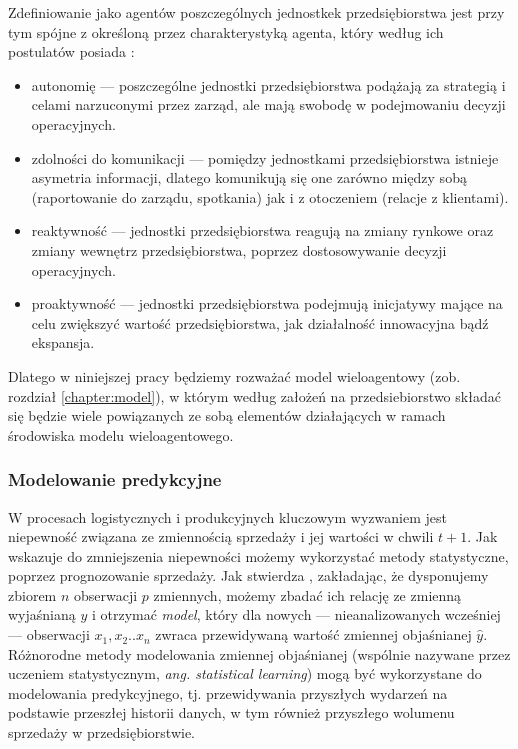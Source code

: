 \documentclass[polish, twoside, 12pt, a4paper]{article}
\theoremstyle{definition}
\theoremstyle{plain}
\theoremstyle{remark}
\begin{document}
Zdefiniowanie jako agentów poszczególnych jednostkek przedsiębiorstwa jest przy tym spójne z określoną przez \cite{Wooldridge1995} charakterystyką agenta, który według ich postulatów posiada : 

	\begin{itemize}
		\item autonomię --- poszczególne jednostki przedsiębiorstwa podążają za strategią i celami narzuconymi przez zarząd, ale mają swobodę w podejmowaniu decyzji operacyjnych.
		\item zdolności do komunikacji --- pomiędzy jednostkami przedsiębiorstwa istnieje asymetria informacji, dlatego komunikują się one zarówno między sobą (raportowanie do zarządu, spotkania) jak i z otoczeniem (relacje z klientami).
		\item reaktywność --- jednostki przedsiębiorstwa reagują na zmiany rynkowe oraz zmiany wewnętrz przedsiębiorstwa, poprzez dostosowywanie decyzji operacyjnych.
	 	\item proaktywność --- jednostki przedsiębiorstwa podejmują inicjatywy mające na celu zwiększyć wartość przedsiębiorstwa, jak działalność innowacyjna bądź ekspansja. 
	\end{itemize}
 
 Dlatego w niniejszej pracy będziemy rozważać model wieloagentowy (zob. rozdział \ref{chapter:model}), w którym według założeń na przedsiebiorstwo składać się będzie wiele powiązanych ze sobą elementów działających w ramach środowiska modelu wieloagentowego. 

\subsubsection{Modelowanie predykcyjne} \label{chapter:statistical} 
W procesach logistycznych i produkcyjnych kluczowym wyzwaniem jest niepewność związana ze zmiennością sprzedaży i jej wartości w chwili $t+1$. Jak wskazuje \cite{James2013} do zmniejszenia niepewności możemy wykorzystać metody statystyczne, poprzez prognozowanie sprzedaży. Jak stwierdza \cite{James2013}, zakładając, że dysponujemy zbiorem $n$ obserwacji $p$ zmiennych, możemy zbadać ich relację ze zmienną wyjaśnianą $y$ i otrzymać \textit{model}, który dla nowych --- nieanalizowanych wcześniej --- obserwacji $x_1,x_2..x_n$  zwraca przewidywaną wartość zmiennej objaśnianej $\hat{y}$. Różnorodne metody modelowania zmiennej objaśnianej (wspólnie nazywane przez \cite{James2013} uczeniem statystycznym, \textit{ang. statistical learning}) mogą być wykorzystane do modelowania predykcyjnego, tj. przewidywania przyszłych wydarzeń na podstawie przeszłej historii danych, w tym również przyszłego wolumenu sprzedaży w przedsiębiorstwie. 
\end{document}
